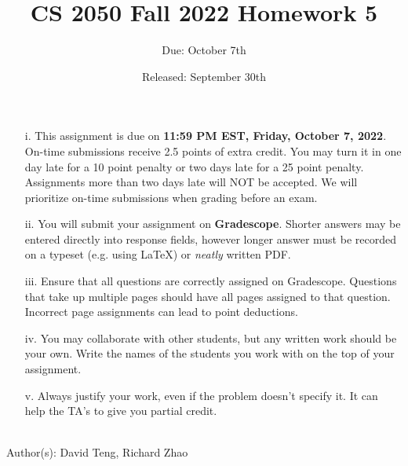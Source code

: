 \documentclass{article}
\title{CS 2050 Fall 2022 Homework 5}
\author{Due: October 7th}
\date{Released: September 30th}
\begin{document}
\maketitle

\begin{enumerate}
    \item[i.] This assignment is due on \textbf{11:59 PM EST, Friday, October 7, 2022}.  On-time submissions receive 2.5 points of extra credit. You may turn it in one day late for a 10 point penalty or two days late for a 25 point penalty. Assignments more than two days late will NOT be accepted.  We will prioritize on-time submissions when grading before an exam.
    \item[ii.] You will submit your assignment on \textbf{Gradescope}. Shorter answers may be entered directly into response fields, however longer answer must be recorded on a typeset (e.g. using \LaTeX) or \emph{neatly} written PDF.
    \item[iii.] Ensure that all questions are correctly assigned on Gradescope. Questions that take up multiple pages should have all pages assigned to that question. Incorrect page assignments can lead to point deductions.
    \item[iv.] You may collaborate with other students, but any written work should be your own. Write the names of the students you work with on the top of your assignment.
    \item[v.] Always justify your work, even if the problem doesn't specify it. It can help the TA's to give you partial credit.
\end{enumerate}
\\

Author(s): David Teng, Richard Zhao

\clearpage
\end{document}
